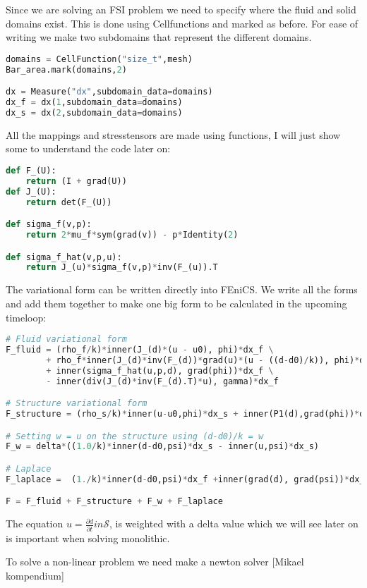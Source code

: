 Since we are solving an FSI problem we need to specify where the fluid and solid domains exist. This is done using Cellfunctions and marked as before. For ease of writing we make two subdomains that represent the different domains.

\begin{lstlisting}[language=Python]
domains = CellFunction("size_t",mesh)
Bar_area.mark(domains,2) 

dx = Measure("dx",subdomain_data=domains)
dx_f = dx(1,subdomain_data=domains)
dx_s = dx(2,subdomain_data=domains)
\end{lstlisting}

All the mappings and stresstensors are made using functions, I will just show some to understand the code later on:

\begin{lstlisting}[language=Python]
def F_(U):
	return (I + grad(U))
def J_(U):
	return det(F_(U))

def sigma_f(v,p):
	return 2*mu_f*sym(grad(v)) - p*Identity(2)

def sigma_f_hat(v,p,u):
	return J_(u)*sigma_f(v,p)*inv(F_(u)).T
\end{lstlisting}

The variational form can be written directly into FEniCS. We write all the forms and add them together to make one big form to be calculated in the upcoming timeloop:
\begin{lstlisting}[language=Python]
# Fluid variational form
F_fluid = (rho_f/k)*inner(J_(d)*(u - u0), phi)*dx_f \
        + rho_f*inner(J_(d)*inv(F_(d))*grad(u)*(u - ((d-d0)/k)), phi)*dx_f \
        + inner(sigma_f_hat(u,p,d), grad(phi))*dx_f \
        - inner(div(J_(d)*inv(F_(d).T)*u), gamma)*dx_f

# Structure variational form
F_structure = (rho_s/k)*inner(u-u0,phi)*dx_s + inner(P1(d),grad(phi))*dx_s

# Setting w = u on the structure using (d-d0)/k = w
F_w = delta*((1.0/k)*inner(d-d0,psi)*dx_s - inner(u,psi)*dx_s)

# Laplace
F_laplace =  (1./k)*inner(d-d0,psi)*dx_f +inner(grad(d), grad(psi))*dx_f 

F = F_fluid + F_structure + F_w + F_laplace
\end{lstlisting}
The equation $ u = \frac{\partial d}{\partial t} in \mathcal{S} $, is weighted with a delta value which we will see later on is important when solving monolithic.


To solve a non-linear problem we need make a newton solver [Mikael kompendium]


